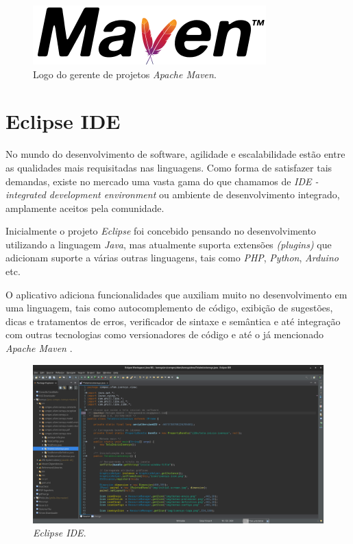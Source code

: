 \documentclass[
	12pt,			%
	openright,		%
	oneside,	
	a4paper,		%
	english,		%
	brazil			%
]{abntex2/abntex2}  %
\begin{document}
	\begin{figure}[H]
		\caption{\label{maven-logo}Logo do gerente de projetos \textit{Apache Maven}.}
		\begin{center}
			\includegraphics[scale=0.5]{img/maven-logo}
		\end{center}
	\end{figure}

	\section{Eclipse IDE}
	
	No mundo do desenvolvimento de software, agilidade e escalabilidade estão entre as qualidades mais requisitadas nas linguagens. Como forma de satisfazer tais demandas, existe no mercado uma vasta gama do que chamamos de \textit{IDE - integrated development environment} ou ambiente de desenvolvimento integrado, amplamente aceitos pela comunidade.
	
	Inicialmente o projeto \textit{Eclipse} \cite{eclipse} foi concebido pensando no desenvolvimento utilizando a linguagem \textit{Java}, mas atualmente suporta extensões \textit{(plugins)} que adicionam suporte a várias outras linguagens, tais como \textit{PHP}, \textit{Python}, \textit{Arduino} etc.
	
	O aplicativo adiciona funcionalidades que auxiliam muito no desenvolvimento em uma linguagem, tais como autocomplemento de código, exibição de sugestões, dicas e tratamentos de erros, verificador de sintaxe e semântica e até integração com outras tecnologias como versionadores de código e até o já mencionado \textit{Apache Maven} \cite{maven}.

	\begin{figure}[H]
		\caption{\label{eclipse-ide}\textit{Eclipse IDE}.}
		\begin{center}
			\includegraphics[scale=0.25]{img/eclipse-ide}
		\end{center}
	\end{figure}
\end{document}
